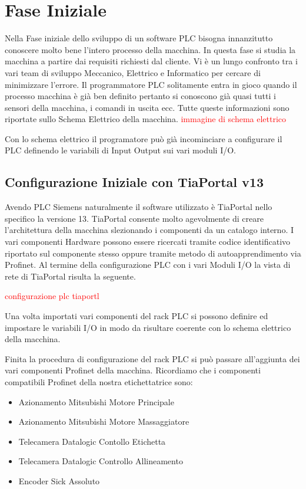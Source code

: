 \documentclass[12pt, a4paper, oneside]{book}
\begin{document}
\section{Fase Iniziale }
Nella Fase iniziale dello sviluppo di un software PLC bisogna innanzitutto conoscere molto bene l'intero processo della macchina. In questa fase si studia la macchina a partire dai requisiti richiesti dal cliente. Vi è un lungo confronto tra i vari team di sviluppo Meccanico, Elettrico e Informatico per cercare di minimizzare l'errore. Il programmatore PLC solitamente entra in gioco quando il processo macchina è già ben definito pertanto si conoscono già quasi tutti i sensori della macchina, i comandi in uscita ecc. 
Tutte queste informazioni sono riportate sullo Schema Elettrico della macchina.
\textcolor{red}{immagine di schema elettrico}

Con lo schema elettrico il programatore può già incominciare a configurare il PLC definendo le variabili di Input Output sui vari moduli I/O. 

\subsection{Configurazione Iniziale con TiaPortal v13}
	Avendo PLC Siemens naturalmente il software utilizzato è TiaPortal nello specifico la versione 13.
	TiaPortal consente molto agevolmente di creare l'architettura della macchina slezionando i componenti da un catalogo interno. I vari componenti Hardware possono essere ricercati tramite codice identificativo riportato sul componente stesso oppure tramite metodo di autoapprendimento via Profinet. Al termine della configurazione PLC con i vari Moduli I/O la vista di rete di TiaPortal risulta la seguente.
	
	\textcolor{red}{configurazione plc tiaportl}

	Una volta importati vari componenti del rack PLC si possono definire ed impostare le variabili I/O in modo da risultare coerente con lo schema elettrico della macchina.
	
	Finita la procedura di configurazione del rack PLC si può passare all'aggiunta dei vari componenti Profinet della macchina. 
	Ricordiamo che i componenti compatibili Profinet della nostra etichettatrice sono:
	\begin{itemize}
		\item Azionamento Mitsubishi Motore Principale
		\item Azionamento Mitsubishi Motore Massaggiatore
		\item Telecamera Datalogic Contollo Etichetta
		\item Telecamera Datalogic Controllo Allineamento
		\item Encoder Sick Assoluto
	\end{itemize}
\end{document}
